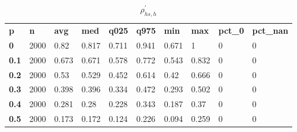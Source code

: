 \begin{table}[h]
 \centering 
\footnotesize
\caption{$\rho_{hs,h}^\prime $}
\label{tab:alphahsh}
\begin{tabular}[h]{| l l l l l l l l l l|
    } \hline
\textbf{ p} & \textbf{ n} & \textbf{ avg} & \textbf{ med} & \textbf{ q025} & \textbf{ q975} & \textbf{ min} & \textbf{ max} & \textbf{ pct\_0} & \textbf{ pct\_nan}
           \\
  \textbf{  0} & 2000 &  0.82 & 0.817 & 0.711 & 0.941 & 0.671 &     1 & 0 & 0
           \\
  \textbf{0.1} & 2000 & 0.673 & 0.671 & 0.578 & 0.772 & 0.543 & 0.832 & 0 & 0
           \\
  \textbf{0.2} & 2000 &  0.53 & 0.529 & 0.452 & 0.614 &  0.42 & 0.666 & 0 & 0
           \\
  \textbf{0.3} & 2000 & 0.398 & 0.396 & 0.334 & 0.472 & 0.293 & 0.502 & 0 & 0
           \\
  \textbf{0.4} & 2000 & 0.281 &  0.28 & 0.228 & 0.343 & 0.187 &  0.37 & 0 & 0
           \\
  \textbf{0.5} & 2000 & 0.173 & 0.172 & 0.124 & 0.226 & 0.094 & 0.259 & 0 & 0
           \\
 \hline \end{tabular}
 \end{table}
